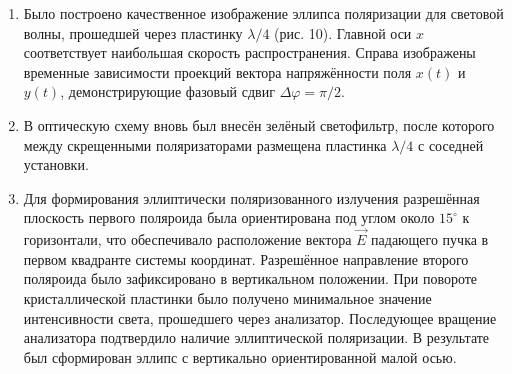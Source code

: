 \documentclass[12pt]{article}
\begin{document}
\begin{enumerate}
    \item Было построено качественное изображение эллипса поляризации для световой волны, прошедшей через пластинку $\lambda/4$ (рис. 10). Главной оси $x$ соответствует наибольшая скорость распространения. Справа изображены временные зависимости проекций вектора напряжённости поля $x(t)$ и $y(t)$, демонстрирующие фазовый сдвиг $\Delta\varphi = \pi/2$.
    
    \item В оптическую схему вновь был внесён зелёный светофильтр, после которого между скрещенными поляризаторами размещена пластинка $\lambda/4$ с соседней установки.
    
    \item Для формирования эллиптически поляризованного излучения разрешённая плоскость первого поляроида была ориентирована под углом около $15^\circ$ к горизонтали, что обеспечивало расположение вектора $\vec{E}$ падающего пучка в первом квадранте системы координат. Разрешённое направление второго поляроида было зафиксировано в вертикальном положении. При повороте кристаллической пластинки было получено минимальное значение интенсивности света, прошедшего через анализатор. Последующее вращение анализатора подтвердило наличие эллиптической поляризации. В результате был сформирован эллипс с вертикально ориентированной малой осью.
    
\end{enumerate}



\end{document}
